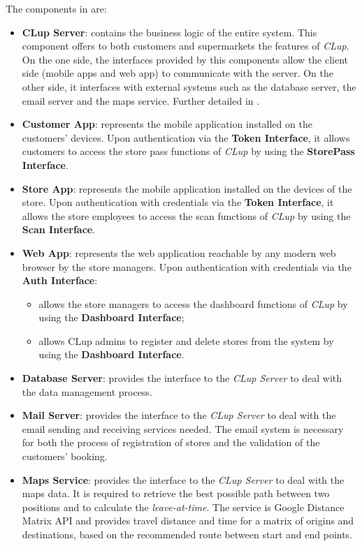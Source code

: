 The components in  are:
\begin{itemize}
	\item \textbf{CLup Server}: contains the business logic of the entire system. This component offers to both customers and supermarkets the features of \textit{CLup}. On the one side, the interfaces provided by this components allow the client side (mobile apps and web app) to communicate with the server. On the other side, it interfaces with external systems such as the database server, the email server and the maps service. Further detailed in .
	
	\item \textbf{Customer App}: represents the mobile application installed on the customers' devices. Upon authentication via the \textbf{Token Interface}, it allows customers to access the store pass functions of \textit{CLup} by using the \textbf{StorePass Interface}.
	
	\item \textbf{Store App}: represents the mobile application	installed on the devices of the store. Upon authentication with credentials via the \textbf{Token Interface}, it allows the store employees to access the scan functions of \textit{CLup} by using the \textbf{Scan Interface}.
	
	\item \textbf{Web App}: represents the web application reachable by any modern web browser by the store managers. Upon authentication with credentials via the \textbf{Auth Interface}:
	\begin{itemize}
		\item allows the store managers to access the dashboard functions of \textit{CLup} by using the \textbf{Dashboard Interface};
		\item allows CLup admins to register and delete stores from the system by using the \textbf{Dashboard Interface}.
	\end{itemize}
	
	\item \textbf{Database Server}:	provides the interface to the \textit{CLup Server} to deal with the data management process. 
	
	\item \textbf{Mail Server}: provides the interface to the \textit{CLup Server} to deal with the email sending and receiving services needed. The email system is necessary for both the process of registration of stores and the validation of the customers' booking.
	
	\item \textbf{Maps Service}: provides the interface to the \textit{CLup Server} to deal with the maps data. It is required to retrieve the best possible path between two positions and to calculate the \textit{leave-at-time}.\newline
	The service is Google Distance Matrix API and provides travel distance and time for a matrix of origins and destinations, based on the recommended route between start and end points.
\end{itemize}

